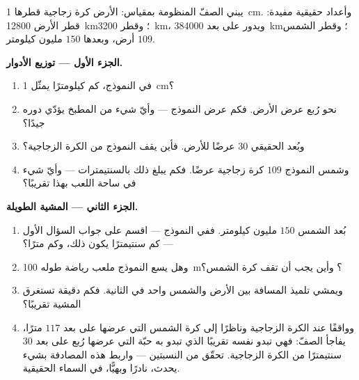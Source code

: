 \begin{problem}\label{pb:g6:sun-earth-moon:1}
يبني الصفّ المنظومة بمقياس: الأرض كرة زجاجية قطرها \qty{1}{cm}.
وأعداد حقيقية مفيدة: قطر الأرض \qty{12800}{km}؛ وقطر 
\qty{3200}{km}، ويدور على بعد \qty{384000}{km}؛ وقطر الشمس $109$
أرض، وبعدها $150$ مليون كيلومتر.

\medskip\noindent\textbf{الجزء الأول --- توزيع الأدوار.}
\begin{enumerate}
  \item في النموذج، كم كيلومترًا يمثّل \qty{1}{cm}؟
  \item {} نحو رُبع عرض الأرض. فكم عرض  النموذج --- وأيّ
        شيء من المطبخ يؤدّي دوره جيدًا؟
  \item وبُعد  الحقيقي $30$ عرضًا للأرض. فأين يقف 
        النموذج من الكرة الزجاجية؟
  \item وشمس النموذج $109$ كرة زجاجية عرضًا. فكم يبلغ ذلك
        بالسنتيمترات --- وأيّ شيء في ساحة اللعب بهذا 
        تقريبًا؟
\end{enumerate}

\medskip\noindent\textbf{الجزء الثاني --- المشية الطويلة.}
\begin{enumerate}[resume]
  \item بُعد الشمس $150$ مليون كيلومتر. ففي النموذج --- اقسم على
        جواب السؤال الأول --- كم سنتيمترًا يكون ذلك، وكم
        مترًا؟
  \item وهل يسع النموذج ملعب رياضة طوله \qty{100}{m}؟ وأين يجب
        أن تقف كرة الشمس؟
  \item ويمشي تلميذ المسافة بين الأرض والشمس   واحد في
        الثانية. فكم دقيقة تستغرق المشية تقريبًا؟
  \item وواقفًا عند الكرة الزجاجية وناظرًا إلى كرة الشمس التي
        عرضها  على بعد $117$ مترًا، يفاجأ الصفّ: فهي تبدو
         نفسه تقريبًا الذي تبدو به حبّة  التي عرضها
        رُبع  على بعد $30$ سنتيمترًا من الكرة الزجاجية.
        تحقّق من النسبتين --- واربط هذه المصادفة بشيء يحدث،
        نادرًا وبهيًّا، في السماء الحقيقية.
\end{enumerate}


\end{problem}
